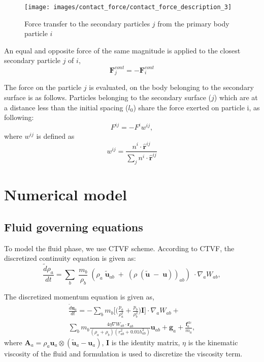 \documentclass[preprint,12pt]{elsarticle}
\newcommand{\todoin}{\todo[inline]}
\newcommand{\ten}[1]{\ensuremath{\mathbf{#1}}}
\begin{document}
\begin{figure}[!htpb]
  \centering
  \texttt{[image: images/contact\_force/contact\_force\_description\_3]}
  \caption{Force transfer to the secondary particles $j$ from the primary body particle $i$}
\label{fig:secondary_particle_contact_foce_transfer}
\end{figure}
An equal and opposite force of the same magnitude is applied to the closest
secondary particle $j$ of $i$,
\begin{equation}
  \label{eq:contact-force}
  \ten{F}_{j}^{cont} = - \ten{F}_{i}^{cont}
\end{equation}

The force on the particle $j$ is evaluated, on the
body belonging to the secondary surface is as follows. Particles belonging to
the secondary surface ($j$) which are at a distance less than the initial
spacing ($l_0$) share the force exerted on particle i, as following:
\begin{equation}
  \label{eq:cf-overlap}
  F^{ij} = - F^{i} w^{ij},
\end{equation}
where $w^{ij}$ is defined as
\begin{equation}
  \label{eq:cf-overlap}
  w^{ij} = \frac{n^{i} \cdot \hat{\ten{r}}^{ij}}{\sum_j n^{i} \cdot \hat{\ten{r}}^{ij}}
\end{equation}


\FloatBarrier%
\section{Numerical model}
\label{sec:fluid-dynamics}

\todoin{Connor FSI}

\subsection{Fluid governing equations}
\label{sec:governing-eqns-fluid-dynamics}
To model the fluid phase, we use CTVF \citet{adepu2021corrected} scheme. According
to CTVF, the discretized continuity equation is given as:
\begin{equation}
  \label{eq:sph-discretization-continuity}
  \frac{\tilde{d}\rho_a}{dt} = \sum_{b} \; \frac{m_b}{\rho_{b}} \; (
  \rho_{a} \; \tilde{\ten{u}}_{ab} \; + \;
  (\rho \; (\tilde{\ten{u}} \; - \;
  \ten{u}))_{ab}) \; \cdot \nabla_{a} W_{ab},
\end{equation}

The discretized momentum equation is given as,
\begin{multline}
  \label{eq:sph-momentum-fluid}
  \frac{\tilde{d}\ten{u}_{a}}{dt} = - \sum_{b} m_b \bigg[
  \bigg(\frac{p_a}{\rho_a^2} + \frac{p_b}{\rho_b^2}\bigg) \ten{I}
   \bigg]
  \cdot \nabla_{a} W_{ab} + \\
  \sum_{b} m_b \frac{4 \eta \nabla W_{ab}\cdot
    \ten{r}_{ab}}{(\rho_a + \rho_b) (r_{ab}^2 + 0.01 h_{ab}^2)} \ten{u}_{ab} +
  \ten{g}_{a} + \frac{\ten{f}^{\text{rfc}}_{a}}{m_a},
\end{multline}
where $\ten{A}_a = \rho_a \ten{u}_a \otimes (\ten{\tilde{u}}_a - \ten{u}_a)$,
$\ten{I}$ is the identity matrix, $\eta$ is the kinematic viscosity of the
fluid and \citet{morris1997modeling} formulation is used to discretize the
viscosity term.
\end{document}
